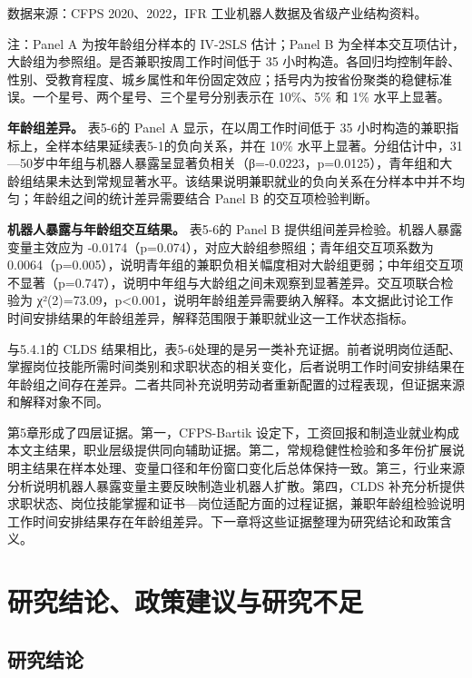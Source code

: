 \documentclass[UTF8, zihao=-4, a4paper, openany, fontset=none]{ctexrep}
\numberwithin{equation}{chapter}
\begin{document}
数据来源：CFPS 2020、2022，IFR 工业机器人数据及省级产业结构资料。

注：Panel A 为按年龄组分样本的 IV-2SLS 估计；Panel B 为全样本交互项估计，大龄组为参照组。是否兼职按周工作时间低于 35 小时构造。各回归均控制年龄、性别、受教育程度、城乡属性和年份固定效应；括号内为按省份聚类的稳健标准误。一个星号、两个星号、三个星号分别表示在 10\%、5\% 和 1\% 水平上显著。

\textbf{年龄组差异。} 表5-6的 Panel A 显示，在以周工作时间低于 35 小时构造的兼职指标上，全样本结果延续表5-1的负向关系，并在 10\% 水平上显著。分组估计中，31---50岁中年组与机器人暴露呈显著负相关（β=-0.0223，p=0.0125），青年组和大龄组结果未达到常规显著水平。该结果说明兼职就业的负向关系在分样本中并不均匀；年龄组之间的统计差异需要结合 Panel B 的交互项检验判断。

\textbf{机器人暴露与年龄组交互结果。} 表5-6的 Panel B 提供组间差异检验。机器人暴露变量主效应为 -0.0174（p=0.074），对应大龄组参照组；青年组交互项系数为 0.0064（p=0.005），说明青年组的兼职负相关幅度相对大龄组更弱；中年组交互项不显著（p=0.747），说明中年组与大龄组之间未观察到显著差异。交互项联合检验为 χ²(2)=73.09，p\textless0.001，说明年龄组差异需要纳入解释。本文据此讨论工作时间安排结果的年龄组差异，解释范围限于兼职就业这一工作状态指标。

与5.4.1的 CLDS 结果相比，表5-6处理的是另一类补充证据。前者说明岗位适配、掌握岗位技能所需时间类别和求职状态的相关变化，后者说明工作时间安排结果在年龄组之间存在差异。二者共同补充说明劳动者重新配置的过程表现，但证据来源和解释对象不同。

第5章形成了四层证据。第一，CFPS-Bartik 设定下，工资回报和制造业就业构成本文主结果，职业层级提供同向辅助证据。第二，常规稳健性检验和多年份扩展说明主结果在样本处理、变量口径和年份窗口变化后总体保持一致。第三，行业来源分析说明机器人暴露变量主要反映制造业机器人扩散。第四，CLDS 补充分析提供求职状态、岗位技能掌握和证书---岗位适配方面的过程证据，兼职年龄组检验说明工作时间安排结果存在年龄组差异。下一章将这些证据整理为研究结论和政策含义。

\chapter{研究结论、政策建议与研究不足}\label{ux7814ux7a76ux7ed3ux8bbaux653fux7b56ux5efaux8baeux4e0eux7814ux7a76ux4e0dux8db3}

\section{研究结论}\label{ux7814ux7a76ux7ed3ux8bba}
\end{document}
